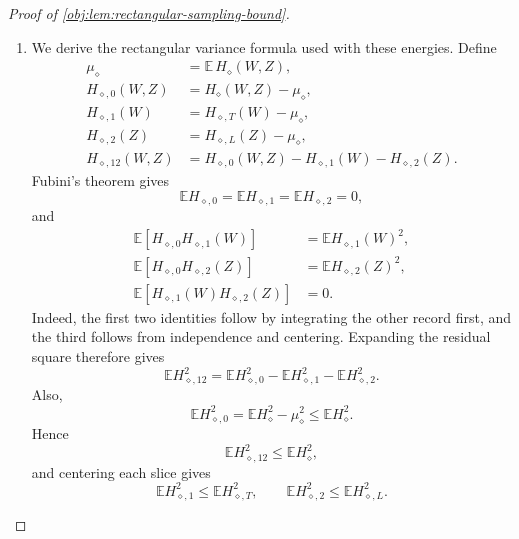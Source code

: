 \begin{proof}[Proof of \cref{obj:lem:rectangular-sampling-bound}]
\begin{enumerate}
Define the integrated slices on the full record domains by
\[
H_{\diamond,T}(W)=\mathbb E_Z H_\diamond(W,Z),
\qquad
H_{\diamond,L}(Z)=\mathbb E_W H_\diamond(W,Z),
\]
where each expectation integrates an independent record with the law specified above. The row-integral estimate gives
\[
\begin{aligned}
\left|
 \mathbb E_Z\!\left[
 w_h(X^L)K_J(x,X^L)f_{\diamond,L}(Z)
 \right]\right|
&\le M_d\,\mathbb E_Z\!
 \left[w_h(X^L)|K_J(x,X^L)|\right]\\
&=M_d\int |K_J(x,x')|\,d\nu_h(x')\\
&\le M_dD_d.
\end{aligned}
\]
Consequently,
\[
|H_{\diamond,T}(W)|
\le M_d^2D_d\,w_h(X^T).
\]
Kernel symmetry gives the corresponding bound with the roles reversed:
\[
|H_{\diamond,L}(Z)|
\le M_d^2D_d\,w_h(X^L).
\]
Squaring and integrating yields
\[
\mathbb E\,H_{\diamond,T}(W)^2
\le\frac{M_d^4D_d^2}{h^d},
\qquad
\mathbb E\,H_{\diamond,L}(Z)^2
\le\frac{M_d^4D_d^2}{h^d}.
\]
All the displayed features and kernels are measurable and square-integrable. In particular, their means, centered squares, and finite-sum integrals are well defined.

\item We derive the rectangular variance formula used with these energies. Define
\[
\begin{aligned}
\mu_\diamond&=\mathbb E\,H_\diamond(W,Z),\\
H_{\diamond,0}(W,Z)&=H_\diamond(W,Z)-\mu_\diamond,\\
H_{\diamond,1}(W)&=H_{\diamond,T}(W)-\mu_\diamond,\\
H_{\diamond,2}(Z)&=H_{\diamond,L}(Z)-\mu_\diamond,\\
H_{\diamond,12}(W,Z)
&=H_{\diamond,0}(W,Z)-H_{\diamond,1}(W)-H_{\diamond,2}(Z).
\end{aligned}
\]
Fubini's theorem gives
\[
\mathbb E H_{\diamond,0}
=\mathbb E H_{\diamond,1}
=\mathbb E H_{\diamond,2}=0,
\]
and
\[
\begin{aligned}
\mathbb E\!\left[H_{\diamond,0}H_{\diamond,1}(W)\right]
&=\mathbb E H_{\diamond,1}(W)^2,\\
\mathbb E\!\left[H_{\diamond,0}H_{\diamond,2}(Z)\right]
&=\mathbb E H_{\diamond,2}(Z)^2,\\
\mathbb E\!\left[H_{\diamond,1}(W)H_{\diamond,2}(Z)\right]
&=0.
\end{aligned}
\]
Indeed, the first two identities follow by integrating the other record first, and the third follows from independence and centering. Expanding the residual square therefore gives
\[
\mathbb E H_{\diamond,12}^2
=\mathbb E H_{\diamond,0}^2
 -\mathbb E H_{\diamond,1}^2
 -\mathbb E H_{\diamond,2}^2.
\]
Also,
\[
\mathbb E H_{\diamond,0}^2
=\mathbb E H_\diamond^2-\mu_\diamond^2
\le\mathbb E H_\diamond^2.
\]
Hence
\[
\mathbb E H_{\diamond,12}^2\le\mathbb E H_\diamond^2,
\]
and centering each slice gives
\[
\mathbb E H_{\diamond,1}^2
\le\mathbb E H_{\diamond,T}^2,
\qquad
\mathbb E H_{\diamond,2}^2
\le\mathbb E H_{\diamond,L}^2.
\]


\end{enumerate}
\end{proof}
